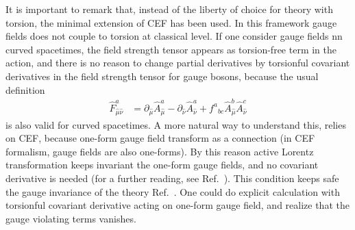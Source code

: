 
It is important to remark that, instead of the liberty of choice for theory with torsion, the minimal extension of CEF has been used. In this framework gauge fields does not couple to torsion at classical level. If one consider gauge fields nn curved spacetimes, the field strength tensor appears as torsion-free term in the action, and there is no reason to change partial derivatives by torsionful covariant derivatives in the field strength tensor for gauge bosons, because the usual definition
\begin{align}
\hat{F}_{\hat{\mu}\hat{\nu}}^a &= \partial_{\hat{\mu}}\hat{A}_{\hat{\mu}}^a - \partial_{\hat{\nu}}\hat{A}_{\hat{\nu}}^a +f^{a}{}_{bc}\hat{A}^b_{\hat{\mu}}\hat{A}^c_{\hat{\nu}}
\end{align}
is also valid for curved spacetimes. A more natural way to understand this, relies on CEF, because one-form gauge field transform as a connection (in CEF formalism, gauge fields are also one-forms). By this reason active Lorentz transformation keeps invariant the one-form gauge fields, and no covariant derivative is needed (for a further reading, see Ref.~\cite{Benn:1980ea}). This condition keeps safe the gauge invariance of the theory Ref.~\cite[p.407]{Hehl:1976kj}. One could do explicit calculation with torsionful covariant derivative acting on one-form gauge field, and realize that the gauge violating terms vanishes.



